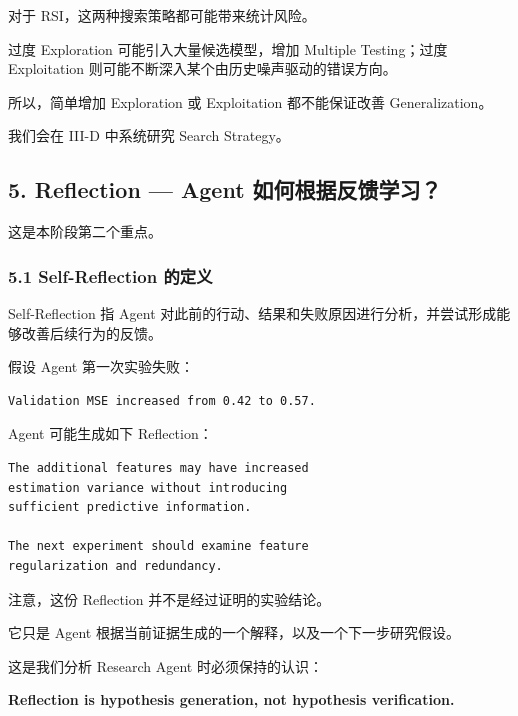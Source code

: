 
对于 RSI，这两种搜索策略都可能带来统计风险。

过度 Exploration 可能引入大量候选模型，增加 Multiple Testing；过度 Exploitation 则可能不断深入某个由历史噪声驱动的错误方向。

所以，简单增加 Exploration 或 Exploitation 都不能保证改善 Generalization。

我们会在 III-D 中系统研究 Search Strategy。

\hypertarget{part-3-34-0001-reflection-agent-ux5982ux4f55ux6839ux636eux53cdux9988ux5b66ux4e60}{%
\subsection{5. Reflection --- Agent 如何根据反馈学习？}\label{part-3-34-0001-reflection-agent-ux5982ux4f55ux6839ux636eux53cdux9988ux5b66ux4e60}}

这是本阶段第二个重点。

\hypertarget{part-3-34-0001-self-reflection-ux7684ux5b9aux4e49}{%
\subsubsection{5.1 Self-Reflection 的定义}\label{part-3-34-0001-self-reflection-ux7684ux5b9aux4e49}}

Self-Reflection 指 Agent 对此前的行动、结果和失败原因进行分析，并尝试形成能够改善后续行为的反馈。

假设 Agent 第一次实验失败：

\begin{verbatim}
Validation MSE increased from 0.42 to 0.57.
\end{verbatim}

Agent 可能生成如下 Reflection：

\begin{verbatim}
The additional features may have increased
estimation variance without introducing
sufficient predictive information.

The next experiment should examine feature
regularization and redundancy.
\end{verbatim}

注意，这份 Reflection 并不是经过证明的实验结论。

它只是 Agent 根据当前证据生成的一个解释，以及一个下一步研究假设。

这是我们分析 Research Agent 时必须保持的认识：

\textbf{Reflection is hypothesis generation, not hypothesis verification.}

